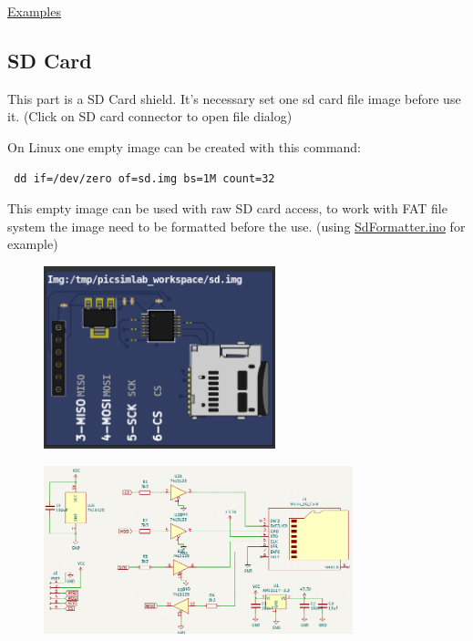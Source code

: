 \href{https://lcgamboa.github.io/picsimlab_examples/parts_RTC_pfc8563.html}{Examples}

\vspace{0.5cm}

\subsection{SD Card}

This part is a SD Card shield. It's necessary set one sd card file image before use it. (Click on SD card connector to open file dialog)

On Linux one empty image can be created with this command: 
\begin{verbatim}
 dd if=/dev/zero of=sd.img bs=1M count=32
\end{verbatim}
This empty image can be used with raw SD card access, to work with FAT file system  the image need to be formatted before the use. (using \href{https://github.com/greiman/SdFat/blob/master/examples/SdFormatter/SdFormatter.ino}{SdFormatter.ino} for example) 

\begin{figure}[H]
\center
\includegraphics[width=0.6\textwidth]{img/part_sdcard.png} 
\end{figure} 

\begin{figure}[H]
\center
\includegraphics[width=0.8\textwidth]{img/part_sdcard_.png} 
\end{figure} 


